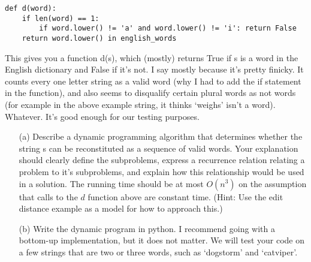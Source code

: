 \documentclass[12pt]{article}
\begin{document}
\begin{enumerate}
\begin{verbatim}
def d(word):
    if len(word) == 1:
	    if word.lower() != 'a' and word.lower() != 'i': return False
    return word.lower() in english_words
    \end{verbatim}
    This gives you a function d(s), which (mostly) returns True if s is a word in the English dictionary and False if it's not. I say mostly because it's pretty finicky. It counts every one letter string as a valid word (why I had to add the if statement in the function), and also seems to disqualify certain plural words as not words (for example in the above example string, it thinks `weighs' isn't a word). Whatever. It's good enough for our testing purposes. \par 
    \begin{itemize}
        \item[(a)] Describe a dynamic programming algorithm that determines whether the string s can be reconstituted as a sequence of valid words. Your explanation should clearly define the subproblems, express a recurrence relation relating a problem to it's subproblems, and explain how this relationship would be used in a solution. The running time should be at most $O(n^3)$ on the assumption that calls to the $d$ function above are constant time. (Hint: Use the edit distance example as a model for how to approach this.)
        \item[(b)] Write the dynamic program in python. I recommend going with a bottom-up implementation, but it does not matter. We will test your code on a few strings that are two or three words, such as `dogstorm' and `catviper'.
    \end{itemize}

\end{enumerate}
\end{document}
